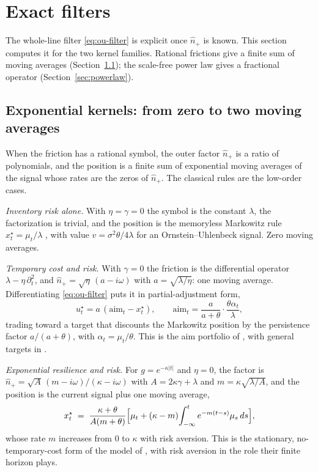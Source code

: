 \documentclass[11pt]{article}
\theoremstyle{plain}
\theoremstyle{definition}
\theoremstyle{remark}
\begin{document}
\section{Exact filters}\label{sec:filters}

The whole-line filter \eqref{eq:ou-filter} is explicit once $\hat n_+$ is known. This section computes it for the two kernel families. Rational frictions give a finite sum of moving averages (Section~\ref{sec:rational}); the scale-free power law gives a fractional operator (Section~\ref{sec:powerlaw}).

\subsection{Exponential kernels: from zero to two moving averages}\label{sec:rational}

When the friction has a rational symbol, the outer factor $\hat n_+$ is a ratio of polynomials, and the position is a finite sum of exponential moving averages of the signal whose rates are the zeros of $\hat n_+$. The classical rules are the low-order cases.

\emph{Inventory risk alone.} With $\eta=\gamma=0$ the symbol is the constant $\lambda$, the factorization is trivial, and the position is the memoryless Markowitz rule $x^\star_t=\mu_t/\lambda$ \citep{Markowitz1952,Merton1971}, with value $v=\sigma^2\theta/4\lambda$ for an Ornstein--Uhlenbeck signal. Zero moving averages.

\emph{Temporary cost and risk.} With $\gamma=0$ the friction is the differential operator $\lambda-\eta\,\partial_t^2$, and $\hat n_+=\sqrt\eta\,(a-i\omega)$ with $a=\sqrt{\lambda/\eta}$: one moving average. Differentiating \eqref{eq:ou-filter} puts it in partial-adjustment form,
\begin{equation}\label{eq:gp}
u^\star_t = a\,(\mathrm{aim}_t-x^\star_t), \qquad
\mathrm{aim}_t = \frac{a}{a+\theta}\cdot\frac{\theta\alpha_t}{\lambda},
\end{equation}
trading toward a target that discounts the Markowitz position by the persistence factor $a/(a+\theta)$, with $\alpha_t=\mu_t/\theta$. This is the aim portfolio of \citet{GarleanuPedersen2016}, with general targets in \citet{BankSonerVoss2017}.

\emph{Exponential resilience and risk.} For $g=e^{-\kappa|t|}$ and $\eta=0$, the factor is $\hat n_+=\sqrt A\,(m-i\omega)/(\kappa-i\omega)$ with $A=2\kappa\gamma+\lambda$ and $m=\kappa\sqrt{\lambda/A}$, and the position is the current signal plus one moving average,
\begin{equation}\label{eq:ema}
x^\star_t \;=\; \frac{\kappa+\theta}{A(m+\theta)}\Bigl[\mu_t + (\kappa-m)\!\int_{-\infty}^t e^{-m(t-s)}\mu_s\,ds\Bigr],
\end{equation}
whose rate $m$ increases from $0$ to $\kappa$ with risk aversion. This is the stationary, no-temporary-cost form of the model of \citet{LehalleNeuman2019}, with risk aversion in the role their finite horizon plays.
\end{document}
